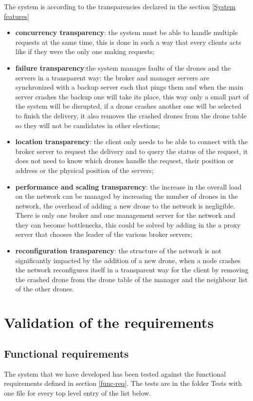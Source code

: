 \documentclass[a4paper, oneside]{memoir}
\begin{document}
The system is according to the transparencies declared in the section \ref{System features}
\begin{itemize}
	\item \textbf{concurrency transparency}: the system must be able to handle multiple requests at the same time, this is done in such a way that every clients acts like if they were the only one making requests;
	\item \textbf{failure transparency}:the system manages faults of the drones and the servers in a transparent way: the broker and manager servers are synchronized with a backup server each that pings them and when the main server crashes the backup one will take its place, this way only a small part of the system will be disrupted, if a drone crashes another one will be selected to finish the delivery, it also removes the crashed drones from the drone table so they will not be candidates in other elections;
	\item \textbf{location transparency}: the client only needs to be able to connect with the broker server to request the delivery and to query the status of the request, it does not need to know which drones handle the request, their position or address or the physical position of the servers;
	\item \textbf{performance and scaling transparency}: the increase in the overall load on the network can be managed by increasing the number of drones in the network, the overhead of adding a new drone to the network is negligible. There is only one broker and one management server for the network and they can become bottlenecks, this could be solved by adding in the a proxy server that chooses the leader of the various broker servers;
	\item \textbf{reconfiguration transparency}: the structure of the network is not significantly impacted by the addition of a new drone, when a node crashes the network reconfigures itself in a transparent way for the client by removing the crashed drone from the drone table of the manager and the neighbour list of the other drones.
\end{itemize}

\section{Validation of the requirements}

\subsection{Functional requirements}
The system that we have developed has been tested against the functional requirements defined in section \ref{func-req}.
The tests are in the folder \textsf{Tests} with one file for every top level 	entry of the list below.
\end{document}
